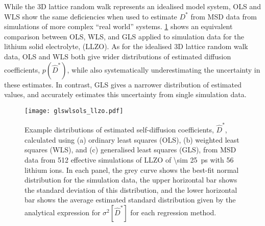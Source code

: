 \documentclass[reprint,superscriptaddress,nobibnotes,amsmath,amssymb,aps,prx,hidelinks]{revtex4-2}
\newcommand{\prob}[1]{\ensuremath{p(#1)}}
\newcommand{\Dest}{\ensuremath{\widehat{D}^*}}
\newcommand{\D}{\ensuremath{D^*}}
\newcommand{\var}[1]{\ensuremath{\sigma^2[#1]}}
\begin{document}
While the 3D lattice random walk represents an idealised model system, OLS and WLS show the same deficiencies when used to estimate $\D$ from MSD data from simulations of more complex ``real world'' systems.
\cref{fig:glswlsols_llzo} shows an equivalent comparison between OLS, WLS, and GLS applied to simulation data for the lithium solid electrolyte,  (LLZO).
As for the idealised 3D lattice random walk data, OLS and WLS both give wider distributions of estimated diffusion coefficients, $\prob{\Dest}$, while also systematically underestimating the uncertainty in these estimates.
In contrast, GLS gives a narrower distribution of estimated values, and accurately estimates this uncertainty from single simulation data.

\begin{figure}[tb]
  \centering
  \texttt{[image: glswlsols\_llzo.pdf]}
    \caption{Example distributions of estimated self-diffusion coefficients, $\Dest$, calculated using (a) ordinary least squares (OLS), (b) weighted least squares (WLS), and (c) generalised least squares (GLS), from MSD data from \num{512} effective simulations of LLZO of \SI{\sim 25}{\pico\second} with \num{56} lithium ions. In each panel, the grey curve shows the best-fit normal distribution for the simulation data, the upper horizontal bar shows the standard deviation of this distribution, and the lower horizontal bar shows the average estimated standard distribution given by the analytical expression for $\var{\Dest}$ for each regression method.}
    \label{fig:glswlsols_llzo}
\end{figure}
\end{document}
